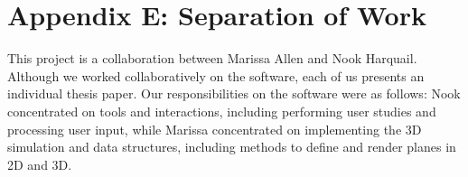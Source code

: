 \section{Appendix E: Separation of
Work}\label{appendix-e-separation-of-work}

This project is a collaboration between Marissa Allen and Nook Harquail.
Although we worked collaboratively on the software, each of us presents
an individual thesis paper. Our responsibilities on the software were as
follows: Nook concentrated on tools and interactions, including
performing user studies and processing user input, while Marissa
concentrated on implementing the 3D simulation and data structures,
including methods to define and render planes in 2D and 3D.
